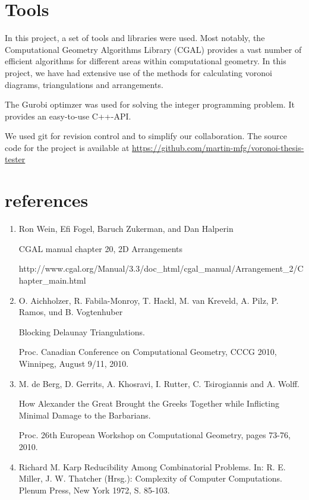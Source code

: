 \documentclass[a4paper,12pt]{article}
\begin{document}
\section{Tools}
In this project, a set of tools and libraries were used. Most notably, the Computational Geometry Algorithms Library (CGAL) provides a vast number of efficient algorithms for different areas within computational geometry. In this project, we have had extensive use of the methods for calculating voronoi diagrams, triangulations and arrangements.

The Gurobi optimzer was used for solving the integer programming problem. It provides an easy-to-use C++-API.

We used git for revision control and to simplify our collaboration. The source code for the project is available at \url{https://github.com/martin-mfg/voronoi-thesis-tester}

\section{references}
\small
\begin{enumerate}
\item
\label{ref:cgal}
Ron Wein, Efi Fogel, Baruch Zukerman, and Dan Halperin

CGAL manual chapter 20, 2D Arrangements

http://www.cgal.org/Manual/3.3/doc\_html/cgal\_manual/Arrangement\_2/Chapter\_main.html

\item
\label{ref:blocking}
O. Aichholzer, R. Fabila-Monroy, T. Hackl, M. van Kreveld, A. Pilz, P. Ramos, und B. Vogtenhuber

Blocking Delaunay Triangulations. 

Proc. Canadian Conference on Computational Geometry, CCCG 2010, Winnipeg, August 9/11, 2010. 


\item
\label{ref:alexander}
M. de Berg, D. Gerrits, A. Khosravi, I. Rutter, C. Tsirogiannis and A. Wolff.

How Alexander the Great Brought the Greeks Together while Inflicting Minimal Damage to the Barbarians.

Proc. 26th European Workshop on Computational Geometry, pages 73-76, 2010.

\item
\label{ref:karp}
Richard M. Karp
Reducibility Among Combinatorial Problems.
In: R. E. Miller, J. W. Thatcher (Hrsg.): Complexity of Computer Computations. Plenum Press, New York 1972, S. 85-103.

\end{enumerate}
\end{document}
